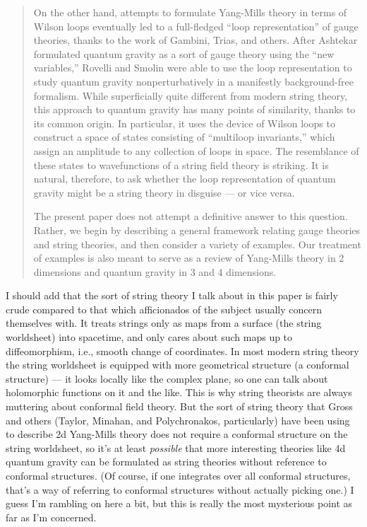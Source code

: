 \documentclass{article}
\begin{document}
\begin{quote}
On the other hand, attempts to formulate Yang-Mills theory in terms of
Wilson loops eventually led to a full-fledged ``loop representation'' of
gauge theories, thanks to the work of Gambini, Trias, and others. After
Ashtekar formulated quantum gravity as a sort of gauge theory using the
``new variables,'' Rovelli and Smolin were able to use the loop
representation to study quantum gravity nonperturbatively in a
manifestly background-free formalism. While superficially quite
different from modern string theory, this approach to quantum gravity
has many points of similarity, thanks to its common origin. In
particular, it uses the device of Wilson loops to construct a space of
states consisting of ``multiloop invariants,'' which assign an amplitude
to any collection of loops in space. The resemblance of these states to
wavefunctions of a string field theory is striking. It is natural,
therefore, to ask whether the loop representation of quantum gravity
might be a string theory in disguise --- or vice versa.

The present paper does not attempt a definitive answer to this question.
Rather, we begin by describing a general framework relating gauge
theories and string theories, and then consider a variety of examples.
Our treatment of examples is also meant to serve as a review of
Yang-Mills theory in 2 dimensions and quantum gravity in 3 and 4
dimensions.
\end{quote}

I should add that the sort of string theory I talk about in this paper
is fairly crude compared to that which afficionados of the subject
usually concern themselves with. It treats strings only as maps from a
surface (the string worldsheet) into spacetime, and only cares about
such maps up to diffeomorphism, i.e., smooth change of coordinates. In
most modern string theory the string worldsheet is equipped with more
geometrical structure (a conformal structure) --- it looks locally like
the complex plane, so one can talk about holomorphic functions on it and
the like. This is why string theorists are always muttering about
conformal field theory. But the sort of string theory that Gross and
others (Taylor, Minahan, and Polychronakos, particularly) have been
using to describe 2d Yang-Mills theory does not require a conformal
structure on the string worldsheet, so it's at least \emph{possible}
that more interesting theories like 4d quantum gravity can be formulated
as string theories without reference to conformal structures. (Of
course, if one integrates over all conformal structures, that's a way of
referring to conformal structures without actually picking one.) I guess
I'm rambling on here a bit, but this is really the most mysterious point
as far as I'm concerned.
\end{document}
